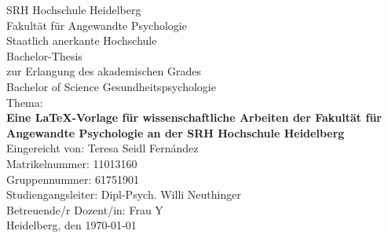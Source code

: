 \begin{titlepage}
\begin{center}

\thispagestyle{empty} 

    SRH Hochschule Heidelberg\\
    Fakultät für Angewandte Psychologie\\
    Staatlich anerkante Hochschule\\[3cm]
    
    Bachelor-Thesis\\   
    zur Erlangung des akademischen Grades\\
    Bachelor of Science Gesundheitspsychologie\\[1.5cm]

    Thema:\\
    {\bf Eine LaTeX-Vorlage für wissenschaftliche Arbeiten der Fakultät für 
    Angewandte Psychologie an der SRH Hochschule Heidelberg} \\[2cm]  

    Eingereicht von: Teresa Seidl Fern\'andez\\    %
    Matrikelnummer: 11013160\\                     %
    Gruppennummer: 61751901\\[2.5cm]               %

    Studiengangsleiter: Dipl-Psych. Willi Neuthinger\\
    Betreuende/r Dozent/in: Frau Y\\[1cm]          %

    Heidelberg, den \today

\end{center}
\end{titlepage}